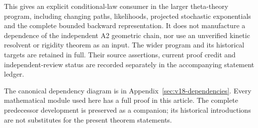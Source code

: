 This gives an explicit conditional-law consumer in the larger theta-theory
program, including changing paths, likelihoods, projected stochastic
exponentials and the complete bounded backward representation. It does not
manufacture a dependence of the independent A2 geometric chain, nor use an
unverified kinetic resolvent or rigidity theorem as an input. The wider
program and its historical targets are retained in full. Their source
assertions, current proof credit and independent-review status are recorded
separately in the accompanying statement ledger.

The canonical dependency diagram is in
Appendix~\ref{sec:v18-dependencies}. Every mathematical module used here
has a full proof in this article. The complete predecessor development is
preserved as a companion; its historical introductions are not substitutes
for the present theorem statements.
